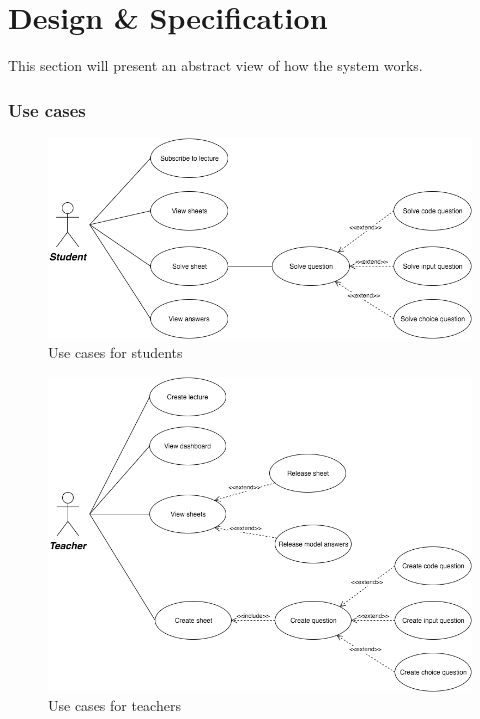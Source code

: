 \chapter{Design \& Specification}

This section will present an abstract view of how the system works.

\subsection{Use cases}
\begin{figure}[H]
  \centering

	\includegraphics[width=\textwidth,height=\textheight,keepaspectratio]{cases}
	\caption{Use cases for students}
\end{figure}

\begin{figure}[H]
  \centering

	\includegraphics[width=\textwidth,height=\textheight,keepaspectratio]{cases2}
	\caption{Use cases for teachers}
\end{figure}

